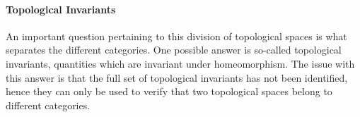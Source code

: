 \paragraph{Topological Invariants}
An important question pertaining to this division of topological spaces is what separates the different categories. One possible answer is so-called topological invariants, quantities which are invariant under homeomorphism. The issue with this answer is that the full set of topological invariants has not been identified, hence they can only be used to verify that two topological spaces belong to different categories.